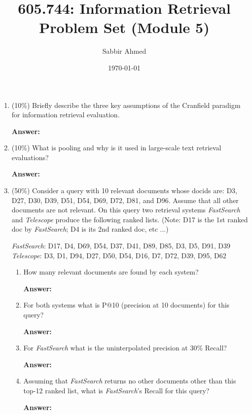 \documentclass[11pt]{article}
\title{605.744: Information Retrieval \\ Problem Set (Module 5)}
\author{Sabbir Ahmed}
\date{\today}
\begin{document}
\maketitle

    \begin{enumerate}

        \item (10\%) Briefly describe the three key assumptions of the Cranfield paradigm for information retrieval evaluation.

        \textbf{Answer:}

        \item (10\%) What is pooling and why is it used in large-scale text retrieval evaluations?

        \textbf{Answer:}

        \item (50\%) Consider a query with 10 relevant documents whose docids are: D3, D27, D30, D39, D51, D54, D69, D72,
        D81, and D96. Assume that all other documents are not relevant. On this query two retrieval systems \textit{FastSearch} and \textit{Telescope} produce the following ranked lists. (Note: D17 is the 1st ranked doc by \textit{FastSearch}; D4 is its 2nd ranked doc, etc ...)

        \textit{FastSearch}: D17, D4, D69, D54, D37, D41, D89, D85, D3, D5, D91, D39
        \textit{Telescope}: D3, D1, D94, D27, D50, D54, D16, D7, D72, D39, D95, D62

        \begin{enumerate}

            \item How many relevant documents are found by each system?

            \textbf{Answer:}

            \item For both systems what is P@10 (precision at 10 documents) for this query?

            \textbf{Answer:}

            \item For \textit{FastSearch} what is the uninterpolated precision at 30\% Recall?

            \textbf{Answer:}

            \item Assuming that \textit{FastSearch} returns no other documents other than this top-12 ranked list, what is \textit{FastSearch}'s Recall for this query?

            \textbf{Answer:}


\end{enumerate}
\end{enumerate}
\end{document}
